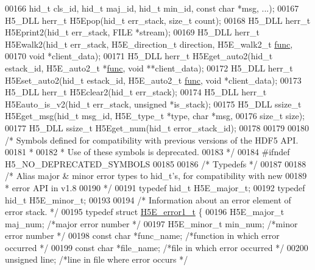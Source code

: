 \begin{DoxyCode}
00166     hid\_t cls\_id, hid\_t maj\_id, hid\_t min\_id, \textcolor{keyword}{const} \textcolor{keywordtype}{char} *msg, ...);
00167 H5\_DLL herr\_t H5Epop(hid\_t err\_stack, \textcolor{keywordtype}{size\_t} count);
00168 H5\_DLL herr\_t H5Eprint2(hid\_t err\_stack, FILE *stream);
00169 H5\_DLL herr\_t H5Ewalk2(hid\_t err\_stack, H5E\_direction\_t direction, H5E\_walk2\_t 
      \hyperlink{structfunc}{func},
00170     \textcolor{keywordtype}{void} *client\_data);
00171 H5\_DLL herr\_t H5Eget\_auto2(hid\_t estack\_id, H5E\_auto2\_t *\hyperlink{structfunc}{func}, \textcolor{keywordtype}{void} **client\_data);
00172 H5\_DLL herr\_t H5Eset\_auto2(hid\_t estack\_id, H5E\_auto2\_t \hyperlink{structfunc}{func}, \textcolor{keywordtype}{void} *client\_data);
00173 H5\_DLL herr\_t H5Eclear2(hid\_t err\_stack);
00174 H5\_DLL herr\_t H5Eauto\_is\_v2(hid\_t err\_stack, \textcolor{keywordtype}{unsigned} *is\_stack);
00175 H5\_DLL ssize\_t H5Eget\_msg(hid\_t msg\_id, H5E\_type\_t *type, \textcolor{keywordtype}{char} *msg,
00176     \textcolor{keywordtype}{size\_t} size);
00177 H5\_DLL ssize\_t H5Eget\_num(hid\_t error\_stack\_id);
00178 
00179 
00180 \textcolor{comment}{/* Symbols defined for compatibility with previous versions of the HDF5 API.}
00181 \textcolor{comment}{ *}
00182 \textcolor{comment}{ * Use of these symbols is deprecated.}
00183 \textcolor{comment}{ */}
00184 \textcolor{preprocessor}{#ifndef H5\_NO\_DEPRECATED\_SYMBOLS}
00185 
00186 \textcolor{comment}{/* Typedefs */}
00187 
00188 \textcolor{comment}{/* Alias major & minor error types to hid\_t's, for compatibility with new}
00189 \textcolor{comment}{ *      error API in v1.8}
00190 \textcolor{comment}{ */}
00191 \textcolor{keyword}{typedef} hid\_t   H5E\_major\_t;
00192 \textcolor{keyword}{typedef} hid\_t   H5E\_minor\_t;
00193 
00194 \textcolor{comment}{/* Information about an error element of error stack. */}
00195 \textcolor{keyword}{typedef} \textcolor{keyword}{struct }\hyperlink{struct_h5_e__error1__t}{H5E\_error1\_t} \{
00196     H5E\_major\_t maj\_num;                \textcolor{comment}{/*major error number                 */}
00197     H5E\_minor\_t min\_num;                \textcolor{comment}{/*minor error number                 */}
00198     \textcolor{keyword}{const} \textcolor{keywordtype}{char}  *func\_name;             \textcolor{comment}{/*function in which error occurred   */}
00199     \textcolor{keyword}{const} \textcolor{keywordtype}{char}  *file\_name;             \textcolor{comment}{/*file in which error occurred       */}
00200     \textcolor{keywordtype}{unsigned}    line;                   \textcolor{comment}{/*line in file where error occurs    */}

\end{DoxyCode}
